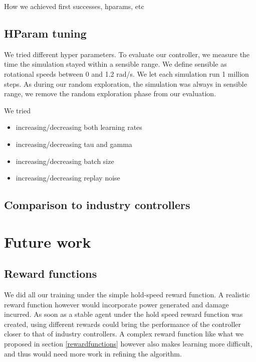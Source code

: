 \documentclass[hyperref,german,beleg]{cgvpub}
\begin{document}
How we achieved first successes, hparams, etc

\section{HParam tuning}
We tried different hyper parameters. To evaluate our controller, we measure the time the simulation stayed within a sensible range. We define sensible as rotational speeds between 0 and 1.2 rad/s. We let each simulation run 1 million steps. As during our random exploration, the simulation was always in sensible range, we remove the random exploration phase from our evaluation.

We tried
\begin{itemize} 
  \item increasing/decreasing both learning rates
  \item increasing/decreasing tau and gamma
  \item increasing/decreasing batch size
  \item increasing/decreasing replay noise
\end{itemize}



\section{Comparison to industry controllers}




\chapter{Future work}

\section{Reward functions}

We did all our training under the simple hold-speed reward function. A realistic reward function however would incorporate power generated and damage incurred. As soon as a stable agent under the hold speed reward function was created, using different rewards could bring the performance of the controller closer to that of industry controllers. A complex reward function like what we proposed in section \ref{rewardfunctions} however also makes learning more difficult, and thus would need more work in refining the algorithm.
\end{document}
